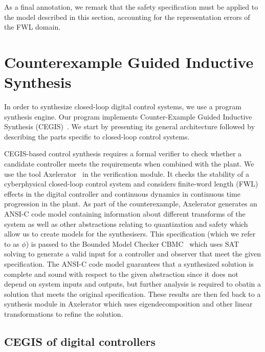 \documentclass[sigconf]{llncs}
\begin{document}
As a final annotation, we remark that the safety specification must be
applied to the model described in this section, accounting for the
representation errors of the FWL domain.

\section{Counterexample Guided Inductive Synthesis} 
\label{ssec:cegis}

In order to synthesize closed-loop digital control systems, we use a program
synthesis engine.  Our program implements Counter-Example Guided
Inductive Synthesis (CEGIS)~\cite{DBLP:conf/asplos/Solar-LezamaTBSS06}.  We
start by presenting its general architecture followed by describing the
parts specific to closed-loop control systems.

CEGIS-based control synthesis requires a formal verifier to check whether a
candidate controller meets the requirements when combined with the plant.
We use the tool Axelerator~\cite{} in the verification module.  It checks the
stability of a cyberphysical closed-loop control system and considers finite-word
length (FWL) effects in the digital controller and continuous dynamics in continuous
time progression in the plant.
As part of the counterexample, Axelerator generates an ANSI-C code model
containing information about different transforms of the system as well as other
abstractions relating to quantization and safety which allow us to create models
for the synthesisers. This specification (which we refer to as $\phi$) is passed to
the Bounded Model Checker CBMC~\cite{ClarkeKL04} which uses SAT solving to
generate a valid input for a controller and observer that meet the given specification.
The ANSI-C code model guarantees that a synthesized solution is complete and
sound with respect to the given abstraction since it does not depend on system
inputs and outputs, but further analysis is required to obatin a solution that meets
the original specification. These results are then fed back to a synthesis module in
Axelerator which uses eigendecomposition and other linear transformations to
refine the solution. 

\subsection{CEGIS of digital controllers} 
\label{sssec:cegisdig}
\end{document}
